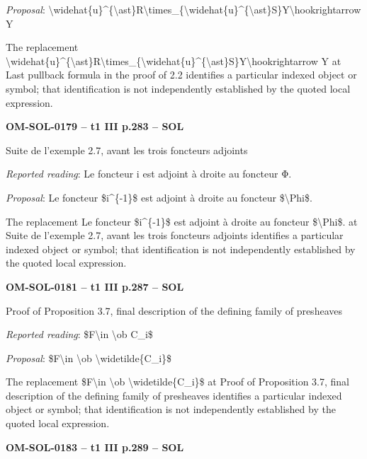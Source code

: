 \emph{Proposal}: \textbackslash{}widehat\{u\}\textasciicircum{}\{\textbackslash{}ast\}R\textbackslash{}times\_\{\textbackslash{}widehat\{u\}\textasciicircum{}\{\textbackslash{}ast\}S\}Y\textbackslash{}hookrightarrow Y\par
The replacement \textbackslash{}widehat\{u\}\textasciicircum{}\{\textbackslash{}ast\}R\textbackslash{}times\_\{\textbackslash{}widehat\{u\}\textasciicircum{}\{\textbackslash{}ast\}S\}Y\textbackslash{}hookrightarrow Y at Last pullback formula in the proof of 2.2 identifies a particular indexed object or symbol; that identification is not independently established by the quoted local expression.\par
\par\noindent\textbf{OM-SOL-0179 -- t1 III p.283 -- SOL}\par
Suite de l'exemple 2.7, avant les trois foncteurs adjoints\par
\emph{Reported reading}: Le foncteur i est adjoint à droite au foncteur Φ.\par
\emph{Proposal}: Le foncteur \$i\textasciicircum{}\{-1\}\$ est adjoint à droite au foncteur \$\textbackslash{}Phi\$.\par
The replacement Le foncteur \$i\textasciicircum{}\{-1\}\$ est adjoint à droite au foncteur \$\textbackslash{}Phi\$. at Suite de l'exemple 2.7, avant les trois foncteurs adjoints identifies a particular indexed object or symbol; that identification is not independently established by the quoted local expression.\par
\par\noindent\textbf{OM-SOL-0181 -- t1 III p.287 -- SOL}\par
Proof of Proposition 3.7, final description of the defining family of presheaves\par
\emph{Reported reading}: \$F\textbackslash{}in \textbackslash{}ob C\_i\$\par
\emph{Proposal}: \$F\textbackslash{}in \textbackslash{}ob \textbackslash{}widetilde\{C\_i\}\$\par
The replacement \$F\textbackslash{}in \textbackslash{}ob \textbackslash{}widetilde\{C\_i\}\$ at Proof of Proposition 3.7, final description of the defining family of presheaves identifies a particular indexed object or symbol; that identification is not independently established by the quoted local expression.\par
\par\noindent\textbf{OM-SOL-0183 -- t1 III p.289 -- SOL}\par
